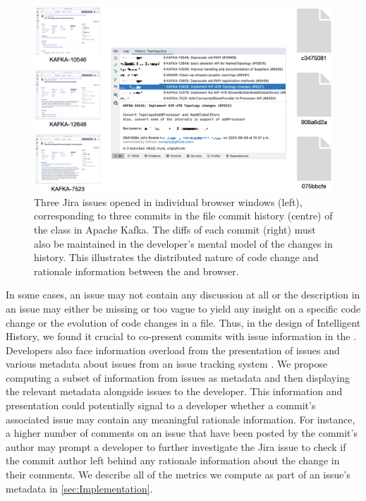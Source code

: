\begin{figure}
    \center
    \includegraphics[width=\textwidth]{./images/cognitive-load.png}
    \caption{
        Three Jira issues opened in individual browser windows (left), corresponding to three commits in the file commit history (centre) of the  class in Apache Kafka. 
        The diffs of each commit (right) must also be maintained in the developer's mental model of the changes in history. 
        This illustrates the distributed nature of code change and rationale information between the  and browser.
    }
    \label{fig:Cognitive-Load}
\end{figure}

In some cases, an issue may not contain any discussion at all or the description in an issue may either be missing 
or too vague to yield any insight on a specific code change or the evolution of code changes in a file.
Thus, in the design of Intelligent History, we found it crucial to co-present commits with issue information in the .
Developers also face information overload from the presentation of issues and 
various metadata about issues from an issue tracking system \cite{baysal_issue-overload_2014,bertram_social-nature_2010}.
We propose computing a subset of information from issues as metadata and then displaying the relevant metadata
alongside issues to the developer.
This information and presentation could potentially signal to a developer whether a commit's associated issue
may contain any meaningful rationale information. 
For instance, a higher number of comments on an issue that have been
posted by the commit's author may prompt a developer to further investigate the Jira issue to check if the
commit author left behind any rationale information about the change in their comments.
We describe all of the metrics we compute as part of an issue's metadata in \autoref{sec:Implementation}.

